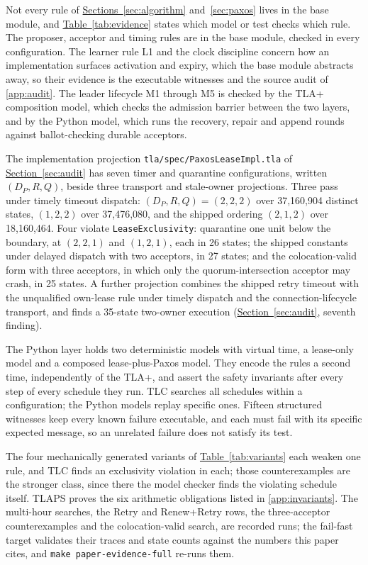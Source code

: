 \documentclass[final,5p,times,twocolumn,number]{elsarticle}
\newcommand{\code}[1]{\texttt{#1}}
\newcommand{\secref}[1]{\hyperref[#1]{Section~\ref*{#1}}}
\newcommand{\secsref}[2]{\hyperref[#1]{Sections~\ref*{#1}} and~\hyperref[#2]{\ref*{#2}}}
\newcommand{\tabref}[1]{\hyperref[#1]{Table~\ref*{#1}}}
\begin{document}
Not every rule of \secsref{sec:algorithm}{sec:paxos} lives in the base module, and \tabref{tab:evidence} states which model or test checks which rule.  The proposer, acceptor and timing rules are in the base module, checked in every configuration.  The learner rule L1 and the clock discipline concern how an implementation surfaces activation and expiry, which the base module abstracts away, so their evidence is the executable witnesses and the source audit of \ref{app:audit}.  The leader lifecycle M1 through M5 is checked by the TLA+ composition model, which checks the admission barrier between the two layers, and by the Python model, which runs the recovery, repair and append rounds against ballot-checking durable acceptors.

The implementation projection \code{tla/spec/PaxosLeaseImpl.tla} of \secref{sec:audit} has seven timer and quarantine configurations, written $(D_P, R, Q)$, beside three transport and stale-owner projections.  Three pass under timely timeout dispatch: $(D_P, R, Q) = (2,2,2)$ over 37{,}160{,}904 distinct states, $(1,2,2)$ over 37{,}476{,}080, and the shipped ordering $(2,1,2)$ over 18{,}160{,}464.  Four violate \code{LeaseExclusivity}: quarantine one unit below the boundary, at $(2,2,1)$ and $(1,2,1)$, each in 26 states; the shipped constants under delayed dispatch with two acceptors, in 27 states; and the colocation-valid form with three acceptors, in which only the quorum-intersection acceptor may crash, in 25 states.  A further projection combines the shipped retry timeout with the unqualified own-lease rule under timely dispatch and the connection-lifecycle transport, and finds a 35-state two-owner execution (\secref{sec:audit}, seventh finding).

The Python layer holds two deterministic models with virtual time, a lease-only model and a composed lease-plus-Paxos model.  They encode the rules a second time, independently of the TLA+, and assert the safety invariants after every step of every schedule they run.  TLC searches all schedules within a configuration; the Python models replay specific ones.  Fifteen structured witnesses keep every known failure executable, and each must fail with its specific expected message, so an unrelated failure does not satisfy its test.

The four mechanically generated variants of \tabref{tab:variants} each weaken one rule, and TLC finds an exclusivity violation in each; those counterexamples are the stronger class, since there the model checker finds the violating schedule itself.  TLAPS proves the six arithmetic obligations listed in \ref{app:invariants}.  The multi-hour searches, the Retry and Renew+Retry rows, the three-acceptor counterexamples and the colocation-valid search, are recorded runs; the fail-fast target validates their traces and state counts against the numbers this paper cites, and \code{make paper-evidence-full} re-runs them.
\end{document}
